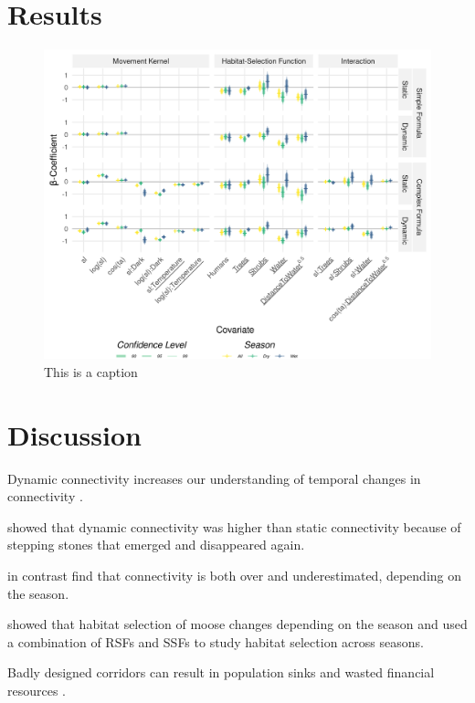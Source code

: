 \documentclass[abstract=on,10pt,a4paper,bibliography=totocnumbered]{article}
\newcommand{\inputy}[1]{\unskip}
\begin{document}
\section{Results}

\begin{figure}
 \begin{center}
  \includegraphics[width = \textwidth]{Figures/MovementModel.png}
  \caption{This is a caption}
  \label{Movement Model}
 \end{center}
\end{figure}

\inputy{Figures/MovementModel.tex}

\section{Discussion}
Dynamic connectivity increases our understanding of temporal changes in
connectivity \citep{Martensen.2017}.

\citet{Martensen.2017} showed that dynamic connectivity was higher than static
connectivity because of stepping stones that emerged and disappeared again.

\citet{Osipova.2019} in contrast find that connectivity is both over and
underestimated, depending on the season.

\citet{Benz.2016} showed that habitat selection of moose changes depending on the
season and used a combination of RSFs and SSFs to study habitat selection across
seasons.

Badly designed corridors can result in population sinks and wasted financial
resources \citep{Simberloff.1992}.
\end{document}
